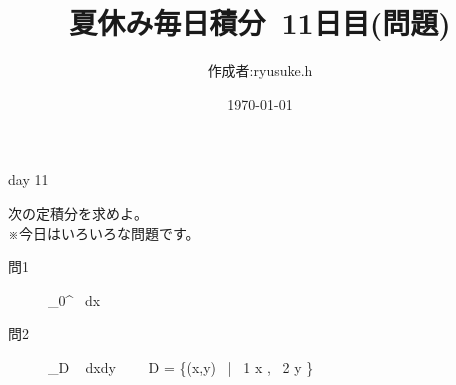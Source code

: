 \documentclass[12pt,a4paper]{jsarticle}
\title{夏休み毎日積分~11日目(問題)}
\date{\today}
\begin{document}
\maketitle
\begin{flushright}
    \author{作成者:ryusuke.h}
\end{flushright}
\begin{itembox}[c]{day 11 }
    \begin{center}
        次の定積分を求めよ。\\
        ※今日はいろいろな問題です。
    \end{center}
\end{itembox}

\begin{description}
    \item [問1] {\displaystyle} \int_0^\infty {} ~dx~
\end{description}

\begin{description}
    \item [問2] {\displaystyle} \iint_D  ~ dxdy~~~~ D = \{(x,y) ~|~ 1 \leqq x ,~ 2 \leqq y \}
\end{description}
\end{document}
